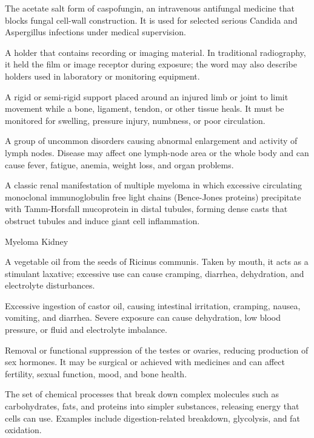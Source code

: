  The acetate salt form of caspofungin, an intravenous antifungal medicine that blocks fungal cell-wall construction. It is used for selected serious Candida and Aspergillus infections under medical supervision.

 A holder that contains recording or imaging material. In traditional radiography, it held the film or image receptor during exposure; the word may also describe holders used in laboratory or monitoring equipment.

 A rigid or semi-rigid support placed around an injured limb or joint to limit movement while a bone, ligament, tendon, or other tissue heals. It must be monitored for swelling, pressure injury, numbness, or poor circulation.

 A group of uncommon disorders causing abnormal enlargement and activity of lymph nodes. Disease may affect one lymph-node area or the whole body and can cause fever, fatigue, anemia, weight loss, and organ problems.

 A classic renal manifestation of multiple myeloma in which excessive circulating monoclonal immunoglobulin free light chains (Bence-Jones proteins) precipitate with Tamm-Horsfall mucoprotein in distal tubules, forming dense casts that obstruct tubules and induce giant cell inflammation.

\synonyms
Myeloma Kidney

 A vegetable oil from the seeds of Ricinus communis. Taken by mouth, it acts as a stimulant laxative; excessive use can cause cramping, diarrhea, dehydration, and electrolyte disturbances.

 Excessive ingestion of castor oil, causing intestinal irritation, cramping, nausea, vomiting, and diarrhea. Severe exposure can cause dehydration, low blood pressure, or fluid and electrolyte imbalance.

 Removal or functional suppression of the testes or ovaries, reducing production of sex hormones. It may be surgical or achieved with medicines and can affect fertility, sexual function, mood, and bone health.

 The set of chemical processes that break down complex molecules such as carbohydrates, fats, and proteins into simpler substances, releasing energy that cells can use. Examples include digestion-related breakdown, glycolysis, and fat oxidation.

